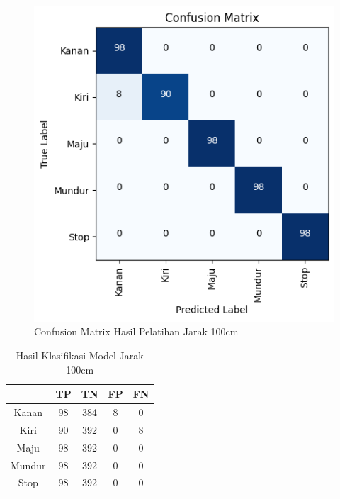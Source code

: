 \begin{figure} [H] \centering
  \includegraphics[scale=0.8]{gambar/100confusion.png}
  \caption{Confusion Matrix Hasil Pelatihan Jarak 100cm}
  \label{fig:ConfusionMatrixHasilPelatihanJarak100cm}
\end{figure}


    \begin{table}[H]
      \centering
      \caption{Hasil Klasifikasi Model Jarak 100cm}
      \label{tb:Hasil Klasifikasi Model Jarak 100cm}
    \begin{tabular}{|c|c|c|c|c|}
      \hline
      \rowcolor[HTML]{C0C0C0} 
      \cellcolor[HTML]{C0C0C0} & TP & TN  & FP & FN \\ \hline
      Kanan                    & 98 & 384 & 8  & 0  \\ \hline
      Kiri                     & 90 & 392 & 0  & 8  \\ \hline
      Maju                     & 98 & 392 & 0  & 0  \\ \hline
      Mundur                   & 98 & 392 & 0  & 0  \\ \hline
      Stop                     & 98 & 392 & 0  & 0  \\ \hline
      \end{tabular}
      \end{table}


